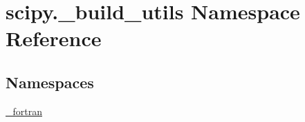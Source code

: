 \hypertarget{namespacescipy_1_1__build__utils}{}\section{scipy.\+\_\+build\+\_\+utils Namespace Reference}
\label{namespacescipy_1_1__build__utils}
\subsection*{Namespaces}
\begin{DoxyCompactItemize}
\item 
 \hyperlink{namespacescipy_1_1__build__utils_1_1__fortran}{\+\_\+fortran}
\end{DoxyCompactItemize}
